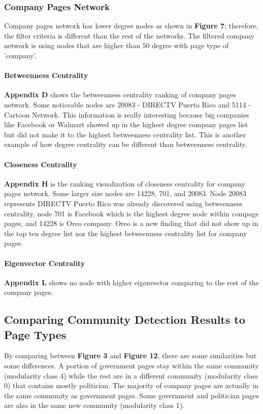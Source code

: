 \documentclass[11pt,twocolumn]{article}
\begin{document}
\subsubsection{Company Pages Network}
Company pages network has lower degree nodes as shown in \textbf{Figure 7}; therefore, the filter criteria is different than the rest of the networks. The filtered company network is using nodes that are higher than 50 degree with page type of 'company'.
\paragraph{Betweenness Centrality}
\textbf{Appendix D} shows the betweenness centrality ranking of company pages network. Some noticeable nodes are 20083 - DIRECTV Puerto Rico and 5114 - Cartoon Network. This information is really interesting because big companies like Facebook or Walmart showed up in the highest degree company pages list but did not make it to the highest betweenness centrality list. This is another example of how degree centrality can be different than betweenness centrality.

\paragraph{Closeness Centrality}
\textbf{Appendix H} is the ranking visualization of closeness centrality for company pages network. Some larger size nodes are 14228, 701, and 20083. Node 20083 represents DIRECTV Puerto Rico was already discovered using betweenness centrality, node 701 is Facebook which is the highest degree node within compage pages, and 14228 is Oreo company. Oreo is a new finding that did not show up in the top ten degree list nor the highest betweenness centrality list for company pages.

\paragraph{Eigenvector Centrality}
\textbf{Appendix L} shows no node with higher eigenvector comparing to the rest of the company pages. 

\subsection{Comparing Community Detection Results to Page Types}
By comparing between \textbf{Figure 3} and \textbf{Figure 12}, there are some similarities but some differences. A portion of government pages stay within the same community (modularity class 4) while the rest are in a different community (modularity class 0) that contains mostly politician. The majority of company pages are actually in the same community as government pages. Some government and politician pages are also in the same new community (modularity class 1).      
\end{document}
